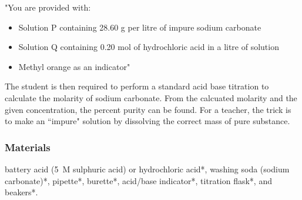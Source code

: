 "You are provided with:
\begin{itemize}
\item{Solution P containing 28.60 g per litre of impure sodium carbonate}
\item{Solution Q containing 0.20 mol of hydrochloric acid in a litre of solution}
\item{Methyl orange as an indicator}"
\end{itemize}
The student is then required to perform a standard acid base titration to calculate the molarity of sodium carbonate. From the calcuated molarity and the given concentration, the percent purity can be found. For a teacher, the trick is to make an ``impure" solution by dissolving the correct mass of pure substance. 
\subsubsection{Materials}
battery acid (5~M sulphuric acid) or hydrochloric acid*, washing soda (sodium carbonate)*, pipette*, burette*, acid/base indicator*, titration flask*, and beakers*.
